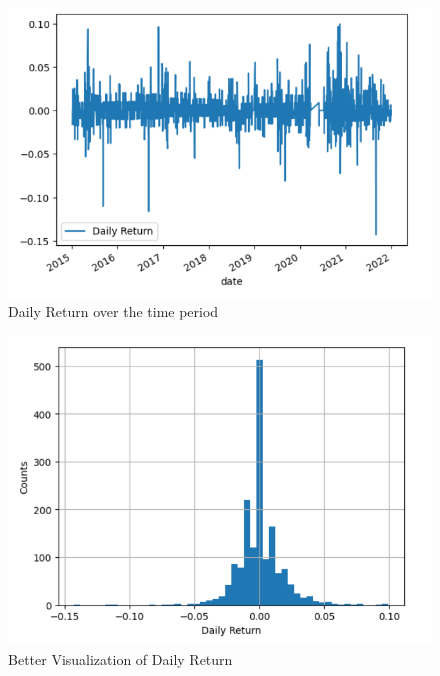 \documentclass[conference]{IEEEtran}
\begin{document}
\begin{figure}[htbp]
    \centering
    \includegraphics[width=0.975\columnwidth]{fig6.png}
    \caption{Daily Return over the time period}
    \label{fig:fig6}
\end{figure}

\begin{figure}[htbp]
    \centering
    \includegraphics[width=0.975\columnwidth]{fig7.png}
    \caption{Better Visualization of Daily Return}
    \label{fig:fig7}
\end{figure}
\end{document}
